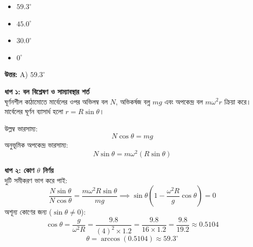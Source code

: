 \documentclass[12pt, a4paper]{article}
\begin{document}
\begin{itemize}[label={}, leftmargin=1cm, itemsep=0.5em]
\item[\textbf{A)}] $59.3^\circ$
\item[\textbf{B)}] $45.0^\circ$
\item[\textbf{C)}] $30.0^\circ$
\item[\textbf{D)}] $0^\circ$
\end{itemize}

\vspace{0.5em}
\begin{tcolorbox}[answerbox]
\textbf{\color{success} উত্তর:} A) $59.3^\circ$
\end{tcolorbox}
\vspace{1em}

\begin{tcolorbox}[solutionbox={সমাধান (Solution)}]
\noindent
\textbf{ধাপ ১: বল বিশ্লেষণ ও সাম্যাবস্থার শর্ত} \\
ঘূর্ণনশীল কাঠামোতে মার্বেলের ওপর অভিলম্ব বল $N$, অভিকর্ষজ বল্ন $mg$ এবং অপকেন্দ্র বল $m \omega^2 r$ ক্রিয়া করে। মার্বেলের ঘূর্ণন ব্যাসার্ধ হলো $r = R \sin\theta$।

উল্লম্ব ভারসাম্য:
\[ N \cos\theta = m g \]
অনুভূমিক অপকেন্দ্র ভারসাম্য:
\[ N \sin\theta = m \omega^2 (R \sin\theta) \]

\vspace{0.5em}
\noindent
\textbf{ধাপ ২: কোণ $\theta$ নির্ণয়} \\
দুটি সমীকরণ ভাগ করে পাই:
\[ \frac{N \sin\theta}{N \cos\theta} = \frac{m \omega^2 R \sin\theta}{m g} \implies \sin\theta \left(1 - \frac{\omega^2 R}{g} \cos\theta\right) = 0 \]
অশূন্য কোণের জন্য ($\sin\theta \neq 0$):
\[ \cos\theta = \frac{g}{\omega^2 R} = \frac{9.8}{(4)^2 \times 1.2} = \frac{9.8}{16 \times 1.2} = \frac{9.8}{19.2} \approx 0.5104 \]
\[ \theta = \arccos(0.5104) \approx 59.3^\circ \]
\end{tcolorbox}
\end{document}
